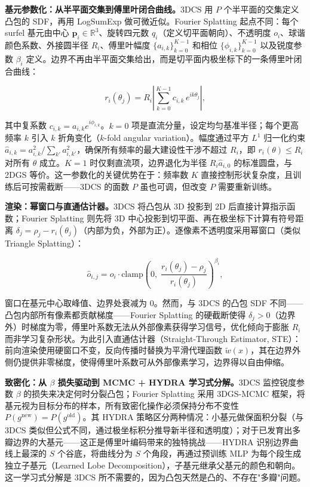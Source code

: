 \textbf{基元参数化：从半平面交集到傅里叶闭合曲线。}3DCS 用 $P$ 个半平面的交集定义凸包的 SDF，再用 LogSumExp 做可微近似。Fourier Splatting 起点不同：每个 surfel 基元由中心 $\mathbf{p}_i \in \mathbb{R}^3$、旋转四元数 $q_i$（定义切平面朝向）、不透明度 $o_i$、球谐颜色系数、外接圆半径 $R_i$、傅里叶幅度 $\{a_{i,k}\}_{k=0}^{K-1}$ 和相位 $\{\phi_{i,k}\}_{k=0}^{K-1}$ 以及锐度参数 $\beta_i$ 定义。边界不再由半平面交集给出，而是切平面内极坐标下的一条傅里叶闭合曲线：

\begin{equation}
    r_i(\theta_j) = R_i \left|\sum_{k=0}^{K-1} c_{i,k} \, e^{i k \theta_j}\right|,
\end{equation}

其中复系数 $c_{i,k} = a_{i,k} e^{i\phi_{i,k}}$。$k=0$ 项是直流分量，设定均匀基准半径；每个更高频率 $k$ 引入 $k$ 折角变化（$k$-fold angular variation）。幅度通过平方 $L^1$ 归一化约束 $\hat{a}_{i,k} = a_{i,k}^2 / \sum_{k'} a_{i,k'}^2$，确保所有频率的最大建设性干涉不超过 $R_i$，即 $r_i(\theta) \leq R_i$ 对所有 $\theta$ 成立。$K=1$ 时仅剩直流项，边界退化为半径 $R_i \hat{a}_{i,0}$ 的标准圆盘，与 2DGS 等价。这一参数化的关键优势在于：频率数 $K$ 直接控制形状复杂度，且训练后可按需截断——3DCS 的面数 $P$ 虽也可调，但改变 $P$ 需要重新训练。

\textbf{渲染：幂窗口与直通估计器。}3DCS 将凸包从 3D 投影到 2D 后直接计算指示函数；Fourier Splatting 则先将 3D 中心投影到切平面、再在极坐标下计算有符号距离 $\delta_j = \rho_j - r_i(\theta_j)$（内部为负，外部为正）。逐像素不透明度采用幂窗口（类似 Triangle Splatting）：

\begin{equation}
    \hat{o}_{i,j} = o_i \cdot \text{clamp}\!\left(0, \;\frac{r_i(\theta_j) - \rho_j}{r_i(\theta_j)}\right)^{\!\beta_i},
\end{equation}

窗口在基元中心取峰值、边界处衰减为 0。然而，与 3DCS 的凸包 SDF 不同——凸包内部所有像素都贡献梯度——Fourier Splatting 的硬截断使得 $\delta_j > 0$（边界外）时梯度为零，傅里叶系数无法从外部像素获得学习信号，优化倾向于膨胀 $R_i$ 而非学习复杂形状。为此引入直通估计器（Straight-Through Estimator, STE）：前向渲染使用硬窗口不变，反向传播时替换为平滑代理函数 $\tilde{w}(x)$，其在边界外侧仍提供非零梯度，使得傅里叶系数可从外部像素学习，边界得以自由伸缩。

\textbf{致密化：从 $\beta$ 损失驱动到 MCMC + HYDRA 学习式分解。}3DCS 监控锐度参数 $\beta$ 的损失来决定何时分裂凸包；Fourier Splatting 采用 3DGS-MCMC 框架，将基元视为目标分布的样本，所有致密化操作必须保持分布不变性 $P(g^{\text{new}}) = P(g^{\text{old}})$。其 HYDRA 策略区分两种情况：小基元做保面积分裂（与 3DCS 类似但公式不同，通过极坐标积分推导新半径和透明度）；对于已发育出多瓣边界的大基元——这正是傅里叶编码带来的独特挑战——HYDRA 识别边界曲线上最深的 $S$ 个谷底，将曲线分为 $S$ 个角段，再通过预训练 MLP 为每个段生成独立子基元（Learned Lobe Decomposition），子基元继承父基元的颜色和朝向。这一学习式分解是 3DCS 所不需要的，因为凸包天然是凸的、不存在"多瓣"问题。


